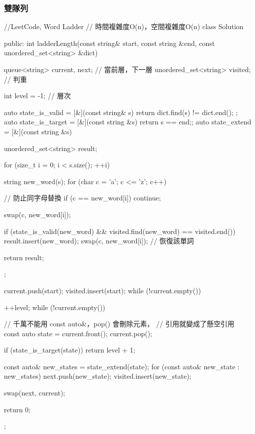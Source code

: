 \subsubsection{雙隊列}
\begin{Code}
//LeetCode, Word Ladder
// 時間複雜度O(n)，空間複雜度O(n)
class Solution {
public:
    int ladderLength(const string& start, const string &end,
            const unordered_set<string> &dict) {
        queue<string> current, next;    // 當前層，下一層
        unordered_set<string> visited;  // 判重

        int level = -1;  // 層次

        auto state_is_valid = [&](const string& s) {
            return dict.find(s) != dict.end();
        };
        auto state_is_target = [&](const string &s) {return s == end;};
        auto state_extend = [&](const string &s) {
            unordered_set<string> result;

            for (size_t i = 0; i < s.size(); ++i) {
                string new_word(s);
                for (char c = 'a'; c <= 'z'; c++) {
                    // 防止同字母替換
                    if (c == new_word[i]) continue;

                    swap(c, new_word[i]);

                    if (state_is_valid(new_word) &&
                        visited.find(new_word) == visited.end()) {
                        result.insert(new_word);
                    }
                    swap(c, new_word[i]); // 恢復該單詞
                }
            }

            return result;
        };

        current.push(start);
        visited.insert(start);
        while (!current.empty()) {
            ++level;
            while (!current.empty()) {
                // 千萬不能用 const auto&，pop() 會刪除元素，
                // 引用就變成了懸空引用
                const auto state = current.front();
                current.pop();

                if (state_is_target(state)) {
                    return level + 1;
                }

                const auto& new_states = state_extend(state);
                for (const auto& new_state : new_states) {
                    next.push(new_state);
                    visited.insert(new_state);
                }
            }
            swap(next, current);
        }
        return 0;
    }
};
\end{Code}


